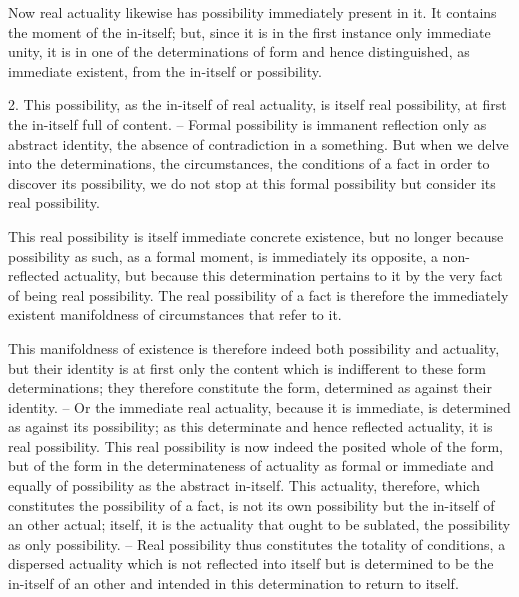 Now real actuality likewise has possibility immediately present in it. It
contains the moment of the in-itself; but, since it is in the first instance
only immediate unity, it is in one of the determinations of form and hence
distinguished, as immediate existent, from the in-itself or possibility.

2. This possibility, as the in-itself of real actuality, is itself real possibility, at
first the in-itself full of content. – Formal possibility is immanent reflection
only as abstract identity, the absence of contradiction in a something. But
when we delve into the determinations, the circumstances, the conditions
of a fact in order to discover its possibility, we do not stop at this formal
possibility but consider its real possibility.

This real possibility is itself immediate concrete existence, but no longer
because possibility as such, as a formal moment, is immediately its opposite,
a non-reflected actuality, but because this determination pertains to it by
the very fact of being real possibility. The real possibility of a fact is therefore
the immediately existent manifoldness of circumstances that refer to it.

This manifoldness of existence is therefore indeed both possibility and
actuality, but their identity is at first only the content which is indifferent to
these form determinations; they therefore constitute the form, determined
as against their identity. – Or the immediate real actuality, because it is
immediate, is determined as against its possibility; as this determinate and
hence reflected actuality, it is real possibility. This real possibility is now
indeed the posited whole of the form, but of the form in the determinateness
of actuality as formal or immediate and equally of possibility as the abstract
in-itself. This actuality, therefore, which constitutes the possibility of a fact,
is not its own possibility but the in-itself of an other actual; itself, it is the
actuality that ought to be sublated, the possibility as only possibility. – Real
possibility thus constitutes the totality of conditions, a dispersed actuality
which is not reflected into itself but is determined to be the in-itself of an
other and intended in this determination to return to itself.

